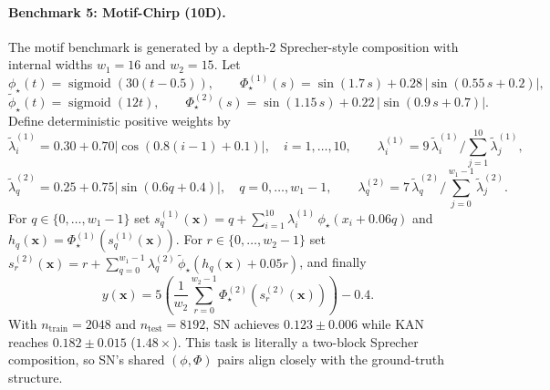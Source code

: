 \documentclass{article}
\theoremstyle{plain}
\theoremstyle{definition}
\theoremstyle{remark}
\begin{document}
\paragraph{Benchmark 5: Motif-Chirp (10D).}
The motif benchmark is generated by a depth-2 Sprecher-style composition with internal widths $w_1=16$ and $w_2=15$. Let
$$\phi_\star(t)=\operatorname{sigmoid}(30(t-0.5)),\qquad
\Phi^{(1)}_\star(s)=\sin(1.7\,s)+0.28\,\bigl|\sin(0.55\,s+0.2)\bigr|,$$
$$\tilde{\phi}_\star(t)=\operatorname{sigmoid}(12t),\qquad
\Phi^{(2)}_\star(s)=\sin(1.15\,s)+0.22\,\bigl|\sin(0.9\,s+0.7)\bigr|.$$
Define deterministic positive weights by
$$\tilde{\lambda}^{(1)}_i = 0.30+0.70|\cos(0.8(i-1) + 0.1)|,\quad i=1,\dots,10,\qquad
\lambda^{(1)}_i = 9\,\tilde{\lambda}^{(1)}_i/\sum_{j=1}^{10} \tilde{\lambda}^{(1)}_j,$$
$$\tilde{\lambda}^{(2)}_q = 0.25+0.75|\sin(0.6q + 0.4)|,\quad q=0,\dots,w_1-1,\qquad
\lambda^{(2)}_q = 7\,\tilde{\lambda}^{(2)}_q/\sum_{j=0}^{w_1-1} \tilde{\lambda}^{(2)}_j.$$
For $q\in\{0,\dots,w_1-1\}$ set $s^{(1)}_q(\mathbf{x}) = q + \sum_{i=1}^{10} \lambda^{(1)}_i\,\phi_\star(x_i + 0.06 q)$ and $h_q(\mathbf{x}) = \Phi^{(1)}_\star(s^{(1)}_q(\mathbf{x}))$. For $r\in\{0,\dots,w_2-1\}$ set
 $s^{(2)}_r(\mathbf{x}) = r + \sum_{q=0}^{w_1-1} \lambda^{(2)}_q\,\tilde{\phi}_\star(h_q(\mathbf{x}) + 0.05 r)$, and finally
$$y(\mathbf{x}) = 5\left(\frac1{w_2}\sum_{r=0}^{w_2-1}\Phi^{(2)}_\star(s^{(2)}_r(\mathbf{x}))\right) - 0.4.$$
With $n_{\text{train}}=2048$ and $n_{\text{test}}=8192$, SN achieves $0.123 \pm 0.006$ while KAN reaches $0.182 \pm 0.015$ ($1.48\times$). This task is literally a two-block Sprecher composition, so SN's shared $(\phi,\Phi)$ pairs align closely with the ground-truth structure.
\end{document}
